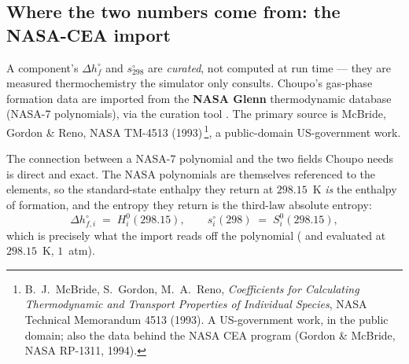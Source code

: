 \documentclass[11pt,a4paper]{article}
\begin{document}
\subsection{Where the two numbers come from: the NASA-CEA import}
\label{sec:gibbs-nasa-import}

A component's $\Delta h^{\circ}_{f}$ and $s^{\circ}_{298}$ are
\emph{curated}, not computed at run time --- they are measured
thermochemistry the simulator only consults.  Choupo's gas-phase
formation data are imported from the \textbf{NASA Glenn} thermodynamic
database (NASA-7 polynomials), via the curation tool
.  The primary source is McBride,
Gordon \& Reno, NASA TM-4513 (1993)\,\footnote{B.~J.~McBride,
S.~Gordon, M.~A.~Reno, \emph{Coefficients for Calculating Thermodynamic
and Transport Properties of Individual Species}, NASA Technical
Memorandum 4513 (1993).  A US-government work, in the public domain;
also the data behind the NASA CEA program (Gordon \& McBride, NASA
RP-1311, 1994).}, a public-domain US-government work.

The connection between a NASA-7 polynomial and the two fields Choupo
needs is direct and exact.  The NASA polynomials are themselves
referenced to the elements, so the standard-state enthalpy they return
at $298.15$~K \emph{is} the enthalpy of formation, and the entropy they
return is the third-law absolute entropy:
\begin{equation}
   \Delta h^{\circ}_{f,i} \;=\; H^{0}_i(298.15),
   \qquad
   s^{\circ}_{i}(298) \;=\; S^{0}_i(298.15),
\end{equation}
which is precisely what the import reads off the polynomial
( and 
evaluated at $298.15$~K, $1$~atm).
\end{document}
